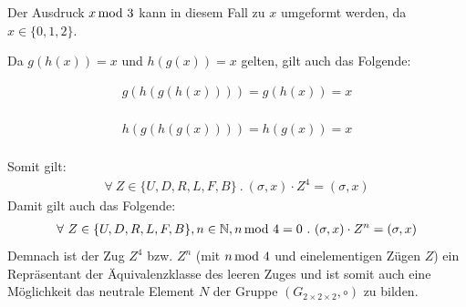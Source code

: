\documentclass[12pt,a4paper, usenames, dvipsnames]{article}
\theoremstyle{mystyle}
\theoremstyle{definition}
\newcommand{\Gtwo}{\ensuremath{G_{2\times 2\times 2}}}
\begin{document}
Der Ausdruck $x \hspace*{-0.5em} \mod 3$ kann in diesem Fall zu $x$ umgeformt werden, da $x \in \{0,1,2\}$. 


Da $g(h(x))=x$ und $h(g(x))=x$ gelten, gilt auch das Folgende:

\begin{minipage}[H]{0.5\textwidth}
	\begin{align*}
		g(h(g(h(x)))) = g(h(x)) = x \\
	\end{align*}
\end{minipage}
\begin{minipage}[H]{0.5\textwidth}
      \begin{align*}
			h(g(h(g(x)))) = h(g(x)) = x \\
	  \end{align*}
\end{minipage}

Somit gilt:
\begin{align*}
\forall \ Z \in \{U, D, R, L, F, B\} \ . \ (\sigma, x) \cdot Z^4 = (\sigma, x)
\end{align*}
Damit gilt auch das Folgende:
\begin{align*}
\forall \ Z \in \{U, D, R, L, F, B\}, n \in \mathbb{N}, n \hspace*{-0.5em} \mod 4 = 0 \ . \ (\sigma, x) \cdot Z^n = (\sigma, x)
\end{align*}
Demnach ist der Zug $Z^4$ bzw. $Z^n$ (mit $n \hspace*{-0.5em} \mod 4$ und einelementigen Zügen $Z$) ein Repräsentant der Äquivalenzklasse des leeren Zuges und ist somit auch eine Möglichkeit das neutrale Element $N$ der Gruppe $(\Gtwo, \circ)$ zu bilden.
\end{document}
